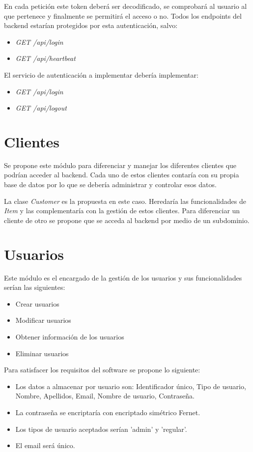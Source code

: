 \bigskip
En cada petición este token deberá ser decodificado, se comprobará al usuario al que pertenece y finalmente se permitirá el acceso o no. Todos los endpoints del backend estarían protegidos por esta autenticación, salvo:
\begin{itemize}
	\item \textit{GET /api/login}
	\item \textit{GET /api/heartbeat}
\end{itemize}


\bigskip
El servicio de autenticación a implementar debería implementar:
\begin{itemize}
	\item \textit{GET /api/login}
	\item \textit{GET /api/logout}
\end{itemize}



\section{Clientes}

Se propone este módulo para diferenciar y manejar los diferentes clientes que podrían acceder al backend. Cada uno de estos clientes contaría con su propia base de datos por lo que se debería administrar y controlar esos datos.

\bigskip
La clase \textit{Customer} es la propuesta en este caso. Heredaría las funcionalidades de \textit{Item} y las complementaría con la gestión de estos clientes. Para diferenciar un cliente de otro se propone que se acceda al backend por medio de un subdominio.



\section{Usuarios}

Este módulo es el encargado de la gestión de los usuarios y sus funcionalidades serían las siguientes:
\begin{itemize}
	\item Crear usuarios
	\item Modificar usuarios
	\item Obtener información de los usuarios
	\item Eliminar usuarios
\end{itemize}


\bigskip
Para satisfacer los requisitos del software se propone lo siguiente:
\begin{itemize}
	\item Los datos a almacenar por usuario son: Identificador único, Tipo de usuario, Nombre, Apellidos, Email, Nombre de usuario, Contraseña.
	\item La contraseña se encriptaría con encriptado simétrico Fernet.
	\item Los tipos de usuario aceptados serían 'admin' y 'regular'.
	\item El email será único.
\end{itemize}



